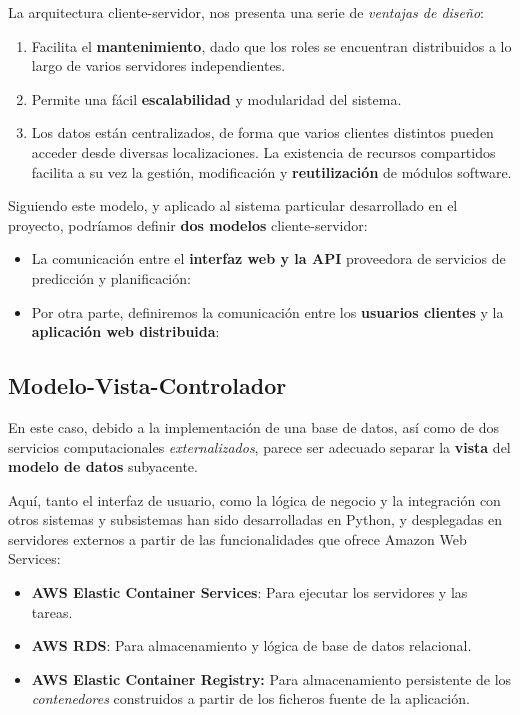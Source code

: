 La arquitectura cliente-servidor, nos presenta una serie de \textit{ventajas de diseño}\cite{Rana2022HighDesign}:

\begin{enumerate}[label=\Alph*]
    \item Facilita el \textbf{mantenimiento}, dado que los roles se encuentran distribuidos a lo largo de varios servidores independientes.
    \item Permite una fácil \textbf{escalabilidad} y modularidad del sistema.
    \item Los datos están centralizados, de forma que varios clientes distintos pueden acceder desde diversas localizaciones. La existencia de recursos compartidos facilita a su vez la gestión, modificación y \textbf{reutilización} de módulos software.
\end{enumerate}

Siguiendo este modelo, y aplicado al sistema particular desarrollado en el proyecto, podríamos definir \textbf{dos modelos} cliente-servidor:

\begin{itemize}
    \item La comunicación entre el \textbf{interfaz web y la API} proveedora de servicios de predicción y planificación:
    \item Por otra parte, definiremos la comunicación entre los \textbf{usuarios clientes} y la \textbf{aplicación web distribuida}:
\end{itemize}

\subsection{Modelo-Vista-Controlador}

En este caso, debido a la implementación de una base de datos, así como de dos servicios computacionales \textit{externalizados}, parece ser adecuado separar la \textbf{vista} del \textbf{modelo de datos} subyacente\cite{Pop2014DesigningDevelopment}.

Aquí, tanto el interfaz de usuario, como la lógica de negocio y la integración con otros sistemas y subsistemas han sido desarrolladas en Python, y desplegadas en servidores externos a partir de las funcionalidades que ofrece Amazon Web Services:

\begin{itemize}
    \item \textbf{AWS Elastic Container Services}: Para ejecutar los servidores y las tareas.
    \item \textbf{AWS RDS}: Para almacenamiento y lógica de base de datos relacional.
    \item \textbf{AWS Elastic Container Registry:} Para almacenamiento persistente de los \textit{contenedores} construidos a partir de los ficheros fuente de la aplicación.
\end{itemize}

